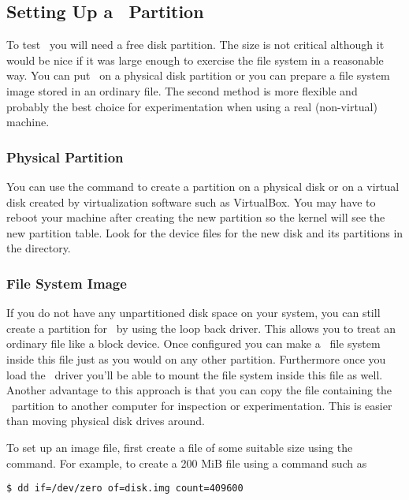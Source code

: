 \subsection{Setting Up a \GenericFS\ Partition}
\label{sec:partition}

To test \GenericFS\ you will need a free disk partition. The size is not critical although it
would be nice if it was large enough to exercise the file system in a reasonable way. You can
put \GenericFS\ on a physical disk partition or you can prepare a file system image stored in an
ordinary file. The second method is more flexible and probably the best choice for
experimentation when using a real (non-virtual) machine.

\subsubsection{Physical Partition}

You can use the  command to create a partition on a physical disk or on a virtual
disk created by virtualization software such as VirtualBox. You may have to reboot your machine
after creating the new partition so the kernel will see the new partition table. Look for the
device files for the new disk and its partitions in the  directory.


\subsubsection{File System Image}

If you do not have any unpartitioned disk space on your system, you can still create a partition
for \GenericFS\ by using the loop back driver. This allows you to treat an ordinary file like a
block device. Once configured you can make a \GenericFS\ file system inside this file just as
you would on any other partition. Furthermore once you load the \GenericFS\ driver you'll be
able to mount the file system inside this file as well. Another advantage to this approach is
that you can copy the file containing the \GenericFS\ partition to another computer for
inspection or experimentation. This is easier than moving physical disk drives around.

To set up an image file, first create a file of some suitable size using the 
command. For example, to create a 200 MiB file using a command such as
\begin{verbatim}
$ dd if=/dev/zero of=disk.img count=409600
\end{verbatim}


